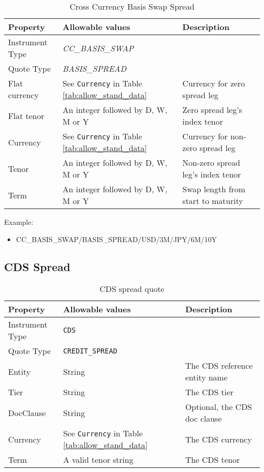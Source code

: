 \begin{table}[H]
\centering
  \begin{tabular}{|p{3cm}|p{3.5cm}|p{7cm}|}
    \hline
    {\bf Property} & {\bf Allowable values} & {\bf Description} \\ \hline
    Instrument Type & \emph{CC\_BASIS\_SWAP} & \\ \hline
    Quote Type & \emph{BASIS\_SPREAD} & \\ \hline
    Flat currency & See \lstinline!Currency! in Table \ref{tab:allow_stand_data} & Currency for zero spread leg\\  \hline
    Flat tenor & An integer followed by D, W, M or Y & Zero spread leg's index tenor\\ \hline
    Currency & See \lstinline!Currency! in Table \ref{tab:allow_stand_data}& Currency for non-zero spread leg\\ \hline
    Tenor & An integer followed by D, W, M or Y & Non-zero spread leg's index tenor\\ \hline
    Term & An integer followed by D, W, M or Y & Swap length from start to maturity\\ \hline
  \end{tabular}
  \caption{Cross Currency Basis Swap Spread}
  \label{tab:ccbasisspread_quote}
\end{table}


\medskip
Example:
\begin{itemize}
\item {CC\_BASIS\_SWAP/BASIS\_SPREAD/USD/3M/JPY/6M/10Y}
\end{itemize}

\subsection{CDS Spread}
\label{md:cds_spread_quote}

\begin{table}[H]
\centering
  \begin{tabular}{|p{3cm}|p{3.5cm}|p{7cm}|}
    \hline
    {\bf Property} & {\bf Allowable values} & {\bf Description} \\ \hline
    Instrument Type & \lstinline!CDS! & \\ \hline
    Quote Type & \lstinline!CREDIT_SPREAD! & \\ \hline
    Entity & String & The CDS reference entity name \\ \hline
    Tier & String & The CDS tier \\ \hline
    DocClause & String & Optional, the CDS doc clause \\ \hline
    Currency & See \lstinline!Currency! in Table \ref{tab:allow_stand_data} & The CDS currency\\ \hline
    Term & A valid tenor string & The CDS tenor\\ \hline
  \end{tabular}
  \caption{CDS spread quote}
  \label{tab:cdsspread_quote}
\end{table}

